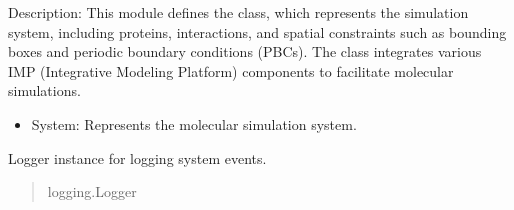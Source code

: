 \documentclass[letterpaper,10pt,english]{sphinxmanual}
\begin{document}
\sphinxAtStartPar
Description:
This module defines the  class, which represents the simulation system,
including proteins, interactions, and spatial constraints such as bounding boxes
and periodic boundary conditions (PBCs). The  class integrates various
IMP (Integrative Modeling Platform) components to facilitate molecular simulations.
\begin{description}
\begin{itemize}
\item {} 
\sphinxAtStartPar
System: Represents the molecular simulation system.

\end{itemize}

\end{description}

\begin{fulllineitems}
\label{\detokenize{src:src.System_Class.logger}}
\pysigstartsignatures
{}
\pysigstopsignatures
\sphinxAtStartPar
Logger instance for logging system events.
\begin{quote}\begin{description}
\sphinxAtStartPar
logging.Logger

\end{description}\end{quote}

\end{fulllineitems}

\end{document}
